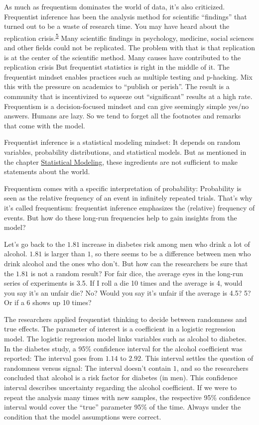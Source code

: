\documentclass[
  10pt,
]{scrbook}
\begin{document}
As much as frequentism dominates the world of data, it's also criticized.
Frequentist inference has been the analysis method for scientific ``findings'' that turned out to be a waste of research time.
You may have heard about the replication crisis.\textsuperscript{\protect\hyperlink{ref-ioannidis2005most}{5}}
Many scientific findings in psychology, medicine, social sciences and other fields could not be replicated.
The problem with that is that replication is at the center of the scientific method.
Many causes have contributed to the replication crisis
But frequentist statistics is right in the middle of it.
The frequentist mindset enables practices such as multiple testing and p-hacking.
Mix this with the pressure on academics to ``publish or perish''.
The result is a community that is incentivized to squeeze out ``significant'' results at a high rate.
Frequentism is a decision-focused mindset and can give seemingly simple yes/no answers.
Humans are lazy.
So we tend to forget all the footnotes and remarks that come with the model.

Frequentist inference is a statistical modeling mindset:
It depends on random variables, probability distributions, and statistical models.
But as mentioned in the chapter \protect\hyperlink{statistical-modeling}{Statistical Modeling}, these ingredients are not sufficient to make statements about the world.

Frequentism comes with a specific interpretation of probability:
Probability is seen as the relative frequency of an event in infinitely repeated trials.
That's why it's called frequentism: frequentist inference emphasizes the (relative) frequency of events.
But how do these long-run frequencies help to gain insights from the model?

Let's go back to the \(1.81\) increase in diabetes risk among men who drink a lot of alcohol.
\(1.81\) is larger than \(1\), so there seems to be a difference between men who drink alcohol and the ones who don't.
But how can the researchers be sure that the \(1.81\) is not a random result?
For fair dice, the average eyes in the long-run series of experiments is 3.5.
If I roll a die 10 times and the average is 4, would you say it's an unfair die?
No? Would you say it's unfair if the average is 4.5? 5? Or if a 6 shows up 10 times?

The researchers applied frequentist thinking to decide between randomness and true effects.
The parameter of interest is a coefficient in a logistic regression model.
The logistic regression model links variables such as alcohol to diabetes.
In the diabetes study, a 95\% confidence interval for the alcohol coefficient was reported:
The interval goes from \(1.14\) to \(2.92\).
This interval settles the question of randomness versus signal:
The interval doesn't contain \(1\), and so the researchers concluded that alcohol is a risk factor for diabetes (in men).
This confidence interval describes uncertainty regarding the alcohol coefficient.
If we were to repeat the analysis many times with new samples, the respective 95\% confidence interval would cover the ``true'' parameter 95\% of the time.
Always under the condition that the model assumptions were correct.
\end{document}
